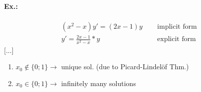 \documentclass[twocolumn]{article}
\begin{document}
	\paragraph{Ex.:}
	\begin{equation}
		\begin{split}
		(x ^{2}-x)y'=(2x-1)y ~~~~~~&\text{implicit form}\\
		y'=\frac{2x-1}{x ^{2}-x}*y ~~~~~& \text{explicit form}
	\end{split}
	\end{equation}
	[...]
	\begin{enumerate}
		\item $x_0\not\in \{0;1\}\rightarrow$ unique sol. (due to Picard-Lindelöf Thm.)
		\item $x_0\in \{0;1\}\rightarrow$ infinitely many solutions
	\end{enumerate}	

	
	
\end{document}
